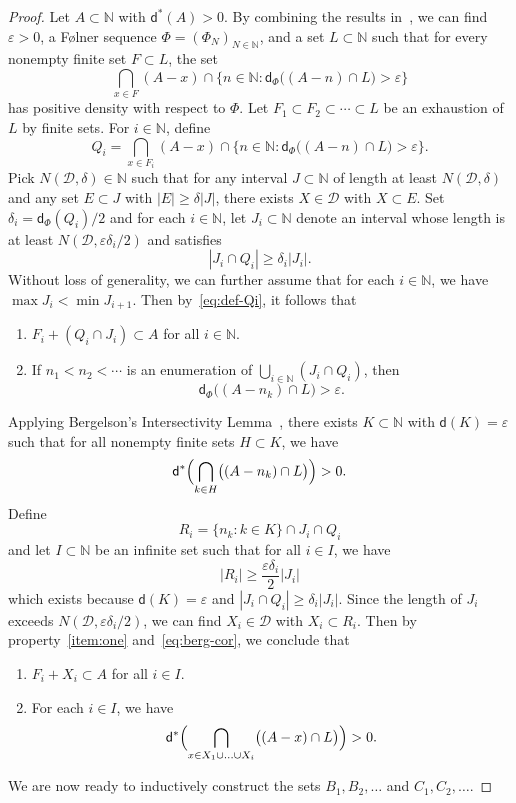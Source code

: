 \documentclass[10pt,dvipsnames]{article}
\theoremstyle{definition}
\theoremstyle{plain}
\newcommand{\N}{\mathbb{N}}
\newcommand{\CD}{\mathcal{D}}
\newcommand{\dens}{\mathsf{d}}
\newcommand{\ubdens}{\mathsf{d}^*}
\begin{document}
\begin{proof} 
Let  $A\subset \N$ with $\ubdens(A)> 0$.  By combining the results in~\cite[Section~2]{MRR}, we can find  $\varepsilon > 0$, a F\o lner sequence $\Phi  = (\Phi_N)_{N\in\N}$, and a set $L\subset \N$ such that for every nonempty finite set $F\subset L$, the set
$$
\bigcap_{x\in F}(A-x)\cap\Big\{n\in\N\colon \dens_\Phi\bigl((A-n)\cap L\bigr)> \varepsilon\Big\}
$$
has positive density with respect to $\Phi$. 
Let $F_1\subset F_2\subset \cdots\subset L$ be an exhaustion of $L$ by finite sets. 
For $i\in\N$, define
\begin{equation}
\label{eq:def-Qi}
Q_i = \bigcap_{x\in F_i}(A-x)\cap\Big\{n\in\N\colon \dens_\Phi\bigl((A-n)\cap L\bigr) > \varepsilon\Big\}. 
\end{equation}
Pick $N(\CD, \delta)\in\N$ such that for any interval $J\subset\N$ of length at least $N(\CD, \delta)$ and any set $E\subset J$ with $|E|\geq \delta |J|$, there exists $X\in\CD$ with $X\subset E$. 
Set $\delta_i = \dens_\Phi(Q_i)/2$ and for each $i\in\N$, let $J_i\subset \N$ denote an interval whose length is at least $N(\CD, \varepsilon\delta_i/2)$ and satisfies 
$$|J_i\cap Q_i|\geq \delta_i|J_i|.
$$
Without loss of generality, we can further assume that for each $i\in\N$, we have $\max J_i < \min J_{i+1}$.  
Then by~\eqref{eq:def-Qi}, it follows that 
\begin{enumerate}
\item \label{item:one}
$F_i+(Q_i\cap J_i)\subset A$ for all $i\in\N$.
\item 
If  $n_1< n_2< \cdots$ is an enumeration of $\bigcup_{i\in\N}(J_i\cap Q_i)$, then 
$$\dens_\Phi\bigl((A-n_k)\cap L\bigr) > \varepsilon.$$
\end{enumerate}
Applying Bergelson's Intersectivity Lemma~\cite[Theorem~2.1]{bergelson}, there exists $K\subset\N$ with $\dens(K) = \varepsilon$ such that for all nonempty finite sets $H\subset K$, we have 
\begin{equation}\label{eq:berg-cor}
\ubdens\Bigl(\bigcap_{k\in H}\bigl((A-n_k)\cap L\bigr)\Bigr) > 0.
\end{equation}
Define
\[
R_i = \{n_k\colon k\in K\}\cap J_i\cap Q_i 
\]
and let $I\subset\N$ be an infinite set such that for all $i\in I$, we have 
\[
|R_i|\geq \frac{\varepsilon\delta_i}{2}|J_i|
\]
which exists because $\dens(K) = \varepsilon$ and $|J_i\cap Q_i|\geq \delta_i|J_i|$. Since the length of $J_i$ exceeds $N(\CD, \varepsilon\delta_i/2)$, we can find $X_i\in \CD$ with $X_i\subset R_i$.
Then by property~\ref{item:one} and~\eqref{eq:berg-cor}, we conclude that 
\begin{enumerate}[resume]
\item
\label{item:three} 
$F_i+X_i\subset A$ for all $i\in I$. 
\item \label{item:four} 
For each $i\in I$, we have  
$$\ubdens\Bigl(\bigcap_{x\in X_1\cup\ldots\cup X_i}\bigl((A-x)\cap L\bigr)\Bigr) > 0.
$$
\end{enumerate}
We are now ready to inductively construct the sets $B_1, B_2,\ldots$ and $C_1, C_2, \ldots$.  


\end{proof}
\end{document}
